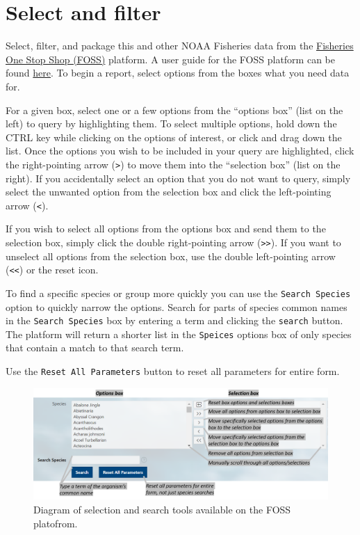 \documentclass[
  letterpaper,
  oneside,
  open=any]{scrbook}
\begin{document}
\hypertarget{select-and-filter}{%
\section{Select and filter}\label{select-and-filter}}

Select, filter, and package this and other NOAA Fisheries data from the
\href{https://www.fisheries.noaa.gov/foss}{Fisheries One Stop Shop
(FOSS)} platform. A user guide for the FOSS platform can be found
\href{https://www.fisheries.noaa.gov/foss/f?p=215:7:7542600605674:::::}{here}.
To begin a report, select options from the boxes what you need data for.

For a given box, select one or a few options from the ``options box''
(list on the left) to query by highlighting them. To select multiple
options, hold down the CTRL key while clicking on the options of
interest, or click and drag down the list. Once the options you wish to
be included in your query are highlighted, click the right-pointing
arrow (\texttt{\textgreater{}}) to move them into the ``selection box''
(list on the right). If you accidentally select an option that you do
not want to query, simply select the unwanted option from the selection
box and click the left-pointing arrow (\texttt{\textless{}}).

If you wish to select all options from the options box and send them to
the selection box, simply click the double right-pointing arrow
(\texttt{\textgreater{}\textgreater{}}). If you want to unselect all
options from the selection box, use the double left-pointing arrow
(\texttt{\textless{}\textless{}}) or the reset icon.

To find a specific species or group more quickly you can use the
\texttt{Search\ Species} option to quickly narrow the options. Search
for parts of species common names in the \texttt{Search\ Species} box by
entering a term and clicking the \texttt{search} button. The platform
will return a shorter list in the \texttt{Speices} options box of only
species that contain a match to that search term.

Use the \texttt{Reset\ All\ Parameters} button to reset all parameters
for entire form.

\begin{figure}

{\centering \includegraphics[width=6.67in,height=\textheight]{content/../img/foss_2_select.png}

}

\caption{Diagram of selection and search tools available on the FOSS
platofrom.}

\end{figure}
\end{document}
